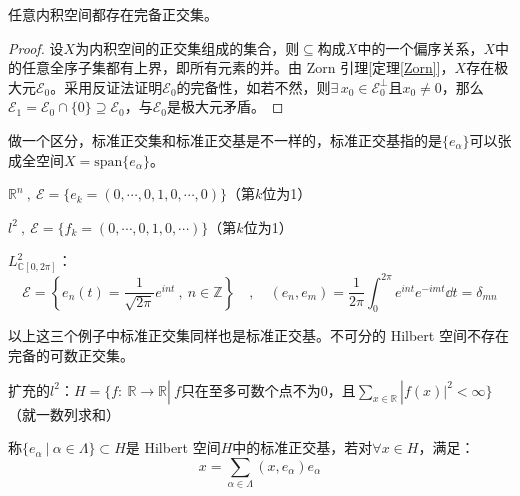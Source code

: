 \begin{theorem}\label{theorem:wbzjj}
任意内积空间都存在完备正交集。
\end{theorem}
\begin{proof}
设$X$为内积空间的正交集组成的集合，则$\subseteq$构成$X$中的一个偏序关系，$X$中的任意全序子集都有上界，即所有元素的并。由 Zorn 引理[定理\ref{Zorn}]，$X$存在极大元$\mathscr{E}_0$。采用反证法证明$\mathscr{E}_0$的完备性，如若不然，则$\exists \, x_0 \in \mathscr{E}_0^{\perp}$且$x_0 \neq 0$，那么$\mathscr{E}_1=\mathscr{E}_0\cap\{0\} \supseteq \mathscr{E}_0$，与$\mathscr{E}_0$是极大元矛盾。
\end{proof}
\begin{remark}
\quad 做一个区分，标准正交集和标准正交基是不一样的，标准正交基指的是$\{e_{\alpha}\}$可以张成全空间$X=\text{span}\{e_{\alpha}\}$。
\end{remark}

\begin{example}
\quad $\mathbb{R}^n \ , \ \mathscr{E}=\{e_k=(0,\cdots,0,1,0,\cdots,0)\}$（第$k$位为1）
\end{example}
\begin{example}
\quad $l^2 \ , \ \mathscr{E}=\{f_k=(0,\cdots,0,1,0,\cdots)\}$（第$k$位为1）
\end{example}
\begin{example}
\quad $L^2_{\mathbb{C}[0,2\pi]}$：
\[\mathscr{E}=\left\{e_n(t)=\frac{1}{\sqrt{2\pi}}e^{int} \ , \ n \in \mathbb{Z}\right\} \quad , \quad (e_n,e_m)=\frac{1}{2\pi}\int_0^{2\pi}e^{int}e^{-imt}\dd{t}=\delta_{mn}\]
\end{example}
以上这三个例子中标准正交集同样也是标准正交基。不可分的 Hilbert 空间不存在完备的可数正交集。
\begin{example}
\quad 扩充的$l^2$：$H=\{f: \ \mathbb{R} \to \mathbb{R} | \ f\text{只在至多可数个点不为0，且}\sum_{x \in \mathbb{R}}|f(x)|^2<\infty\}$（就一数列求和）
\end{example}

\begin{definition}[标准正交基]
称$\{e_{\alpha} \ | \ \alpha \in \Lambda\} \subset H$是 Hilbert 空间$H$中的标准正交基，若对$\forall x \in H$，满足：
\[x=\sum_{\alpha \in \Lambda}(x,e_{\alpha})e_{\alpha}\]
\end{definition}

